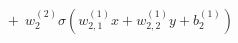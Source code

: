 \documentclass[preview]{standalone}
\begin{document}
\begin{align*}
+ \ \ w_2^{(2)} \sigma(w_{2,1}^{(1)}x + w_{2,2}^{(1)}y +b_2^{(1)})
\end{align*}
\end{document}
